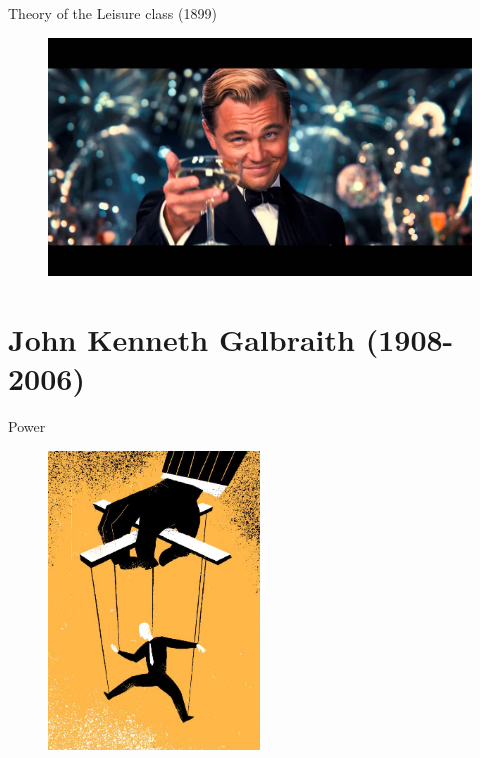 \documentclass{beamer}
\begin{document}
\begin{frame}{Theory of the Leisure class (1899)}
    \begin{figure}
        \centering
        \includegraphics[width=\textwidth]{../img/gatsby.jpg}
    \end{figure}{}
\end{frame}

\section{John Kenneth Galbraith (1908-2006)}

\begin{frame}{Power}

\begin{figure}[htpb]
	\centering
	\includegraphics[width=0.5\textwidth]{../img/power.jpeg}
	\label{fig:power}
\end{figure}

\end{frame}{}
\end{document}

